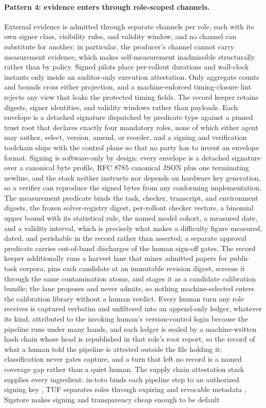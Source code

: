 \documentclass[11pt]{article}
\begin{document}
\paragraph{Pattern 4: evidence enters through role-scoped channels.}
External evidence is admitted through separate channels per role, each with its own signer class, visibility rules, and validity window, and no channel can substitute for another; in particular, the producer's channel cannot carry measurement evidence, which makes self-measurement inadmissible structurally rather than by policy. Signed pilots place per-rollout durations and wall-clock instants only inside an auditor-only execution attestation. Only aggregate counts and bounds cross either projection, and a machine-enforced timing-closure lint rejects any view that leaks the protected timing fields. The record keeper retains digests, signer identities, and validity windows rather than payloads. Each envelope is a detached signature dispatched by predicate type against a pinned trust root that declares exactly four mandatory roles, none of which either agent may author, select, version, amend, or reorder, and a signing and verification toolchain ships with the control plane so that no party has to invent an envelope format. Signing is software-only by design: every envelope is a detached signature over a canonical byte profile, RFC 8785 canonical JSON plus one terminating newline, and the stack neither instructs nor depends on hardware key generation, so a verifier can reproduce the signed bytes from any conforming implementation. The measurement predicate binds the task, checker, transcript, and environment digests, the frozen solver-registry digest, per-rollout checker vectors, a binomial upper bound with its statistical rule, the named model cohort, a measured date, and a validity interval, which is precisely what makes a difficulty figure measured, dated, and perishable in the record rather than asserted; a separate approval predicate carries out-of-band discharges of the human sign-off gates. The record keeper additionally runs a harvest lane that mines admitted papers for public task corpora, pins each candidate at an immutable revision digest, screens it through the same contamination atoms, and stages it as a candidate calibration bundle; the lane proposes and never admits, so nothing machine-selected enters the calibration library without a human verdict. Every human turn any role receives is captured verbatim and unfiltered into an append-only ledger, whatever its kind, attributed to the invoking human's version-control login because the pipeline runs under many hands, and each ledger is sealed by a machine-written hash chain whose head is republished in that role's root report, so the record of what a human told the pipeline is attested outside the file holding it; classification never gates capture, and a turn that left no record is a named coverage gap rather than a quiet human. The supply chain attestation stack supplies every ingredient: in-toto binds each pipeline step to an authorized signing key \citep{torresarias2019intoto}, TUF separates roles through expiring and revocable metadata \citep{samuel2010survivable}, Sigstore makes signing and transparency cheap enough to be default 
\end{document}
